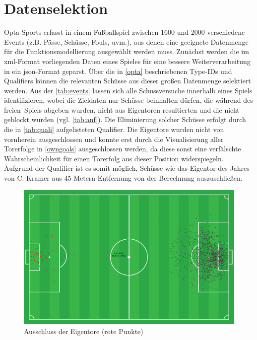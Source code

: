 \section{Datenselektion}
\label{ds}

Opta Sports erfasst in einem Fußballspiel zwischen 1600 und 2000 verschiedene Events (z.B. Pässe, Schüsse, Fouls, uvm.), aus denen eine geeignete Datenmenge für die Funktionsmodellierung ausgewählt werden muss. Zunächst werden die im \gls{xml}-Format vorliegenden Daten eines Spieles für eine bessere Weiterverarbeitung in ein \gls{json}-Format geparst. Über die in \vref{opta} beschriebenen \textsf{Type-IDs} und \textsf{Qualifiers} können die relevanten Schüsse aus dieser großen Datenmenge selektiert werden. Aus der \vref{tab:events} lassen sich alle Schussversuche innerhalb eines Spiels identifizieren, wobei die Zieldaten nur Schüsse beinhalten dürfen, die während des \glqq freien\grqq~Spiels abgeben wurden, nicht aus Eigentoren resultierten und die nicht geblockt wurden (vgl. \vref{tab:anf}). Die Eliminierung solcher Schüsse erfolgt durch die in \vref{tab:quali} aufgelisteten Qualifier. Die Eigentore wurden nicht von vornherein ausgeschlossen und konnte erst durch die Visualisierung aller Torerfolge in \vref{owngoals} ausgeschlossen werden, da diese sonst eine verfälschte Wahrscheinlichkeit für einen Torerfolg aus dieser Position widerspiegeln.\enlargethispage{2\baselineskip} Aufgrund der Qualifier ist es somit möglich, Schüsse wie das \glqq Eigentor des Jahres\grqq{} von C. Kramer aus 45 Metern Entfernung von der Berechnung auszuschließen.

\begin{figure}
\centering
\includegraphics[scale=0.4]{se-wa-jpg/owngoals}
\caption[Ausschluss der Eigentore]{Ausschluss der Eigentore (rote Punkte) }
\label{owngoals}
\end{figure}

